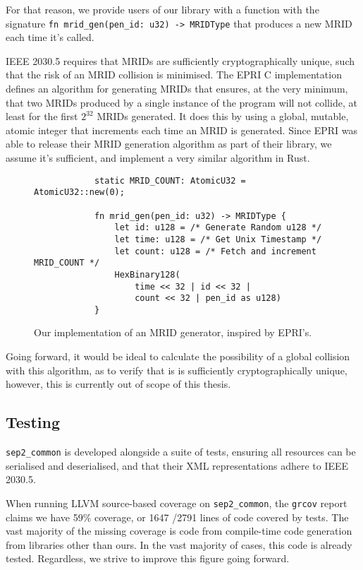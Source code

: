 For that reason, we provide users of our library with a function with the signature \texttt{fn mrid\_gen(pen\_id: u32) -> MRIDType} that produces a new MRID each time it's called.

IEEE 2030.5 requires that MRIDs are sufficiently cryptographically unique, such that the risk of an MRID collision is minimised. The EPRI C implementation defines an algorithm for generating MRIDs that ensures, at the very minimum, that two MRIDs produced by a single instance of the program will not collide, at least for the first $2^{32}$ MRIDs generated. It does this by using a global, mutable, atomic integer that increments each time an MRID is generated. Since EPRI was able to release their MRID generation algorithm as part of their library, we assume it's sufficient, and implement a very similar algorithm in Rust.

\begin{figure}[H]
    \begin{center}
        \begin{lstlisting}
            static MRID_COUNT: AtomicU32 = AtomicU32::new(0);

            fn mrid_gen(pen_id: u32) -> MRIDType {
                let id: u128 = /* Generate Random u128 */
                let time: u128 = /* Get Unix Timestamp */
                let count: u128 = /* Fetch and increment MRID_COUNT */
                HexBinary128(
                    time << 32 | id << 32 | 
                    count << 32 | pen_id as u128)
            }
        \end{lstlisting}
        \label{fig:mridgenalgo}
        \caption{Our implementation of an MRID generator, inspired by EPRI's.}
    \end{center}
\end{figure}


Going forward, it would be ideal to calculate the possibility of a global collision with this algorithm, as to verify that is is sufficiently cryptographically unique, however, this is currently out of scope of this thesis.

\subsection{Testing}
\texttt{sep2\_common} is developed alongside a suite of tests, ensuring all resources can be serialised and deserialised, and that their XML representations adhere to IEEE 2030.5.

When running LLVM source-based coverage on \texttt{sep2\_common}, the \texttt{grcov} report claims we have 59\% coverage, or 1647 \slash 2791 lines of code covered by tests. The vast majority of the missing coverage is code from compile-time code generation from libraries other than ours. In the vast majority of cases, this code is already tested. Regardless, we strive to improve this figure going forward.

